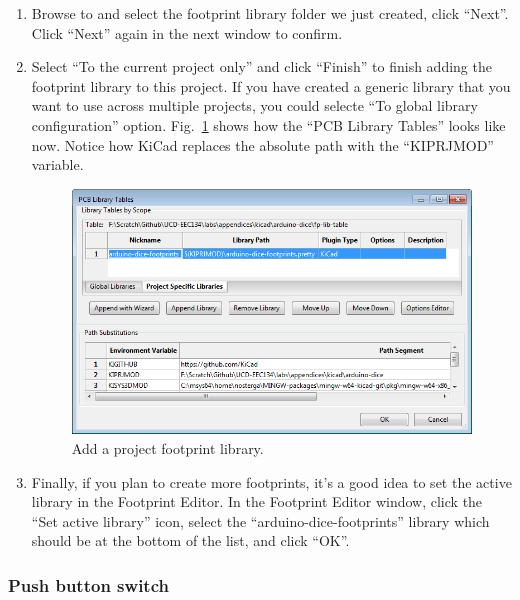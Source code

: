 \documentclass[12pt,letterpaper]{scrartcl}
\begin{document}
\begin{enumerate}
\begin{enumerate}
			\item Browse to and select the footprint library folder we just created, click ``Next''. Click ``Next'' again in the next window to confirm. 
			
			\item Select ``To the current project only'' and click ``Finish'' to finish adding the footprint library to this project. If you have created a generic library that you want to use across multiple projects, you could selecte ``To global library configuration'' option. Fig.~\ref{fig:add-project-footprint-lib} shows how the ``PCB Library Tables'' looks like now. Notice how KiCad replaces the absolute path with the ``KIPRJMOD'' variable. 

					\begin{figure}[h]
						\centering
						\includegraphics[width=5in]{add-project-footprint-lib}
						\caption{Add a project footprint library.}
						\label{fig:add-project-footprint-lib}
					\end{figure}
					
			\item Finally, if you plan to create more footprints, it's a good idea to set the active library in the Footprint Editor. In the Footprint Editor window, click the ``Set active library'' icon, select the ``arduino-dice-footprints'' library which should be at the bottom of the list, and click ``OK''.  
		\end{enumerate}
	
\end{enumerate}

\subsubsection{Push button switch}
\end{document}
